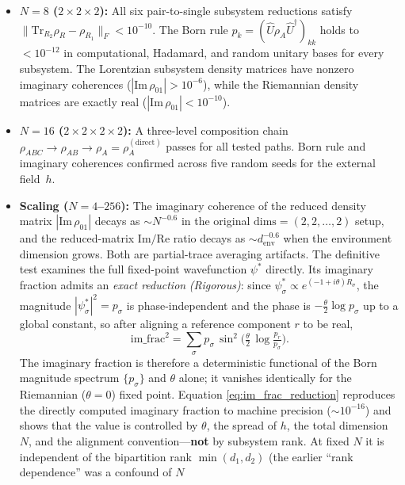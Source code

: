 \documentclass[12pt,a4paper]{article}
\theoremstyle{definition}
\theoremstyle{remark}
\begin{document}
\begin{itemize}
\item \textbf{$N = 8$ ($2 \times 2 \times 2$):} All six pair-to-single
subsystem reductions satisfy $\|\mathrm{Tr}_{R_2}\rho_R -
\rho_{R_1}\|_F < 10^{-10}$. The Born rule
$p_k = (\hat{U}\rho_A\hat{U}^\dagger)_{kk}$ holds to $< 10^{-12}$
in computational, Hadamard, and random unitary bases for every
subsystem. The Lorentzian subsystem density matrices have nonzero
imaginary coherences ($|\mathrm{Im}\,\rho_{01}| > 10^{-6}$), while the
Riemannian density matrices are exactly real ($|\mathrm{Im}\,\rho_{01}|
< 10^{-10}$).
\item \textbf{$N = 16$ ($2 \times 2 \times 2 \times 2$):} A
three-level composition chain
$\rho_{ABC} \to \rho_{AB} \to \rho_A = \rho_A^{(\mathrm{direct})}$
passes for all tested paths. Born rule and imaginary coherences
confirmed across five random seeds for the external field~$h$.
\item \textbf{Scaling ($N = 4$--$256$):} The imaginary coherence of
the reduced density matrix $|\mathrm{Im}\,\rho_{01}|$ decays as $\sim
N^{-0.6}$ in the original $\mathrm{dims} = (2,2,\ldots,2)$ setup, and
the reduced-matrix $\mathrm{Im/Re}$ ratio decays as $\sim
d_{\mathrm{env}}^{-0.6}$ when the environment dimension grows. Both are
partial-trace averaging artifacts. The definitive test examines the full
fixed-point wavefunction $\psi^*$ directly. Its imaginary fraction
admits an \emph{exact reduction} \emph{(Rigorous)}: since
$\psi^*_\sigma \propto e^{(-1+i\theta)R_\sigma}$, the magnitude
$|\psi^*_\sigma|^2 = p_\sigma$ is phase-independent and the phase is
$-\tfrac{\theta}{2}\log p_\sigma$ up to a global constant, so after
aligning a reference component $r$ to be real,
\begin{equation}
\label{eq:im_frac_reduction}
\mathrm{im\_frac}^2
= \sum_\sigma p_\sigma \,
  \sin^2\!\Big(\tfrac{\theta}{2}\,\log\tfrac{p_r}{p_\sigma}\Big).
\end{equation}
The imaginary fraction is therefore a deterministic functional of the
Born magnitude spectrum $\{p_\sigma\}$ and $\theta$ alone; it vanishes
identically for the Riemannian ($\theta = 0$) fixed point. Equation
\eqref{eq:im_frac_reduction} reproduces the directly computed
imaginary fraction to machine precision ($\sim\!10^{-16}$) and shows
that the value is controlled by $\theta$, the spread of $h$, the total
dimension $N$, and the alignment convention---\textbf{not} by subsystem
rank. At fixed $N$ it is independent of the bipartition rank
$\min(d_1,d_2)$ (the earlier ``rank dependence'' was a confound of $N$

\end{itemize}
\end{document}
